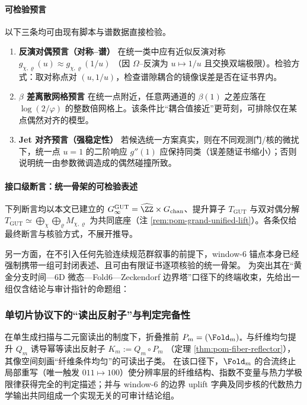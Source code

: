 \paragraph{可检验预言}
以下三条均可由现有脚本与谱数据直接检验。

\begin{enumerate}
  \item \textbf{反演对偶预言（对称--谱）} 在统一类中应有近似反演对称
  \(
  g_{\chi,\varrho}(u)\approx g_{\chi,\varrho}(1/u)
  \)
  （因 \(\Omega\)--反演为 \(u\mapsto 1/u\) 且交换双端极限）。检验方式：取对称点对 \((u,1/u)\)，检查谱隙耦合的镜像误差是否在证书界内。

  \item \textbf{\(\beta\) 差离散网格预言} 在统一点附近，任意两通道的 \(\beta(1)\) 之差应落在 \(\log(2/\varphi)\) 的整数倍网格上。该条件比“耦合值接近”更苛刻，可排除仅在某点偶然对齐的模型。

  \item \textbf{Jet 对齐预言（强稳定性）} 若候选统一方案真实，则在不同观测门/核的微扰下，统一点 \(u=1\) 的二阶响应 \(g''(1)\) 应保持同类（误差随证书缩小）；否则说明统一由参数微调造成的偶然碰撞所致。
\end{enumerate}

\paragraph{接口级断言：统一骨架的可检验表述}\label{par:gut-seven-additional-results}
下列断言均以本文已建立的 \(G_\infty^{\mathrm{GUT}}=\widehat{\ZZ}\times G_{\mathrm{chan}}\)、提升算子 \(T_{\mathrm{GUT}}\) 与双对偶分解
\(
T_{\mathrm{GUT}}\simeq\bigoplus_{\chi}\bigoplus_{\varrho}M_{\chi,\varrho}
\)
为共同底座（注 \ref{rem:pom-grand-unified-lift}）。各条仅给最终断言与核验方式，不展开推导。

另一方面，在不引入任何先验连续规范群叙事的前提下，window-\(6\) 锚点本身已经强制携带一组可封闭表述、且可由有限证书逐项核验的统一骨架。
为突出其在“黄金分支时间—6D 微态—Fold6—Zeckendorf 边界塔”口径下的终端收束，先给出一组仅含结论与审计指针的命题组：





\subsubsection{单切片协议下的“读出反射子”与判定完备性}\label{subsubsec:single-slice-reflector-completeness}
在单生成扫描与二元窗读出的制度下，折叠推前 \(P_m=(\Fold_m)_*\) 与纤维均匀提升 \(Q_m\) 诱导幂等读出反射子
\(
K_m:=Q_m\circ P_m
\)
（定理 \ref{thm:pom-fiber-reflector}），其像空间刻画“纤维条件均匀”的可读出子类。
在该口径下，\(\Fold_m\) 的合流终止局部重写（唯一触发 \(011\mapsto 100\)）使分辨率层的纤维结构、指数不变量与热力学极限律获得完全的判定描述；并与 window-\(6\) 的边界 uplift 字典及同步核的代数热力学输出共同组成一个实现无关的可审计结论组。

